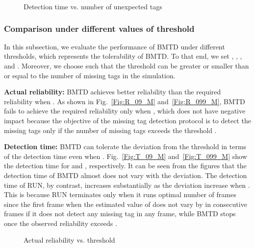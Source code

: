 \documentclass[10pt, twocolumn]{IEEEtran}
\begin{document}
\begin{figure}[htbp]
\centering
{}
\caption{Detection time vs. number of unexpected tags}
\label{Fig:T_U}
\end{figure}

\subsubsection{Comparison under different values of threshold}

In this subsection, we evaluate the performance of BMTD under different thresholds, which represents the tolerability of BMTD. To that end, we set , , ,  and . Moreover, we choose such  that the threshold can be greater or smaller than or equal to the number of missing tags in the simulation.

\textbf{Actual reliability:}
BMTD achieves better reliability than the required reliability when .
As shown in Fig.~\ref{Fig:R_09_M} and~\ref{Fig:R_099_M}, BMTD fails to achieve the required reliability only when , which does not have negative impact because the objective of the missing tag detection protocol is to detect the missing tags only if the number of missing tags exceeds the threshold .

\textbf{Detection time:}
BMTD can tolerate the deviation from the threshold in terms of the detection time even when .
Fig.~\ref{Fig:T_09_M} and~\ref{Fig:T_099_M} show the detection time for  and , respectively. It can be seen from the figures that the detection time of BMTD almost does not vary with the deviation. The detection time of RUN, by contrast, increases substantially as the deviation increase when . This is because RUN terminates only when it runs optimal number of frames since the first frame when the estimated value of  does not vary by  in consecutive  frames if it does not detect any missing tag in any frame, while BMTD stops once the observed reliability  exceeds .

\begin{figure}[htbp]
\centering
{}
\caption{Actual reliability vs. threshold}
\label{Fig:R_M}
\end{figure}
\end{document}
